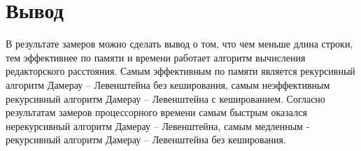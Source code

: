 \section*{Вывод}

В результате замеров можно сделать вывод о том, что чем меньше длина строки, тем эффективнее по памяти и времени работает алгоритм вычисления редакторского расстояния. Самым эффективным по памяти является рекурсивный алгоритм Дамерау­ -- Левенштейна без кеширования, самым неэффективным рекурсивный алгоритм Дамерау­ -- Левенштейна с кешированием. Согласно результатам замеров процессорного времени самым быстрым оказался нерекурсивный алгоритм Дамерау -- Левенштейна, самым медленным - рекурсивный алгоритм Дамерау -- Левенштейна без кеширования.
